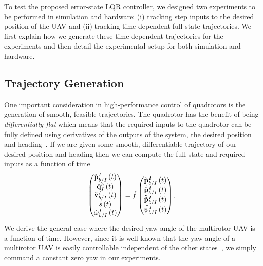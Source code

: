 
To test the proposed error-state LQR controller, we designed two experiments to be
performed in simulation and hardware: (i) tracking step inputs to the desired
position of the UAV and (ii) tracking time-dependent full-state trajectories. We
first explain how we generate these time-dependent trajectories for the
experiments and then detail the experimental setup for both simulation and
hardware.


\subsection{Trajectory Generation}
\label{subsec:trajectory_gen}

One important consideration in high-performance control of quadrotors is the
generation of smooth, feasible trajectories.  The quadrotor has the benefit of
being \emph{differentially flat} which means that the required inputs to the
quadrotor can be fully defined using derivatives of the outputs of the system,
the desired position and
heading~\cite{mellinger2011minimum}. If we are given some smooth, differentiable trajectory of our desired
position and heading then we can compute the full state and required inputs as
a function of time
\begin{equation}
	\begin{pmatrix} \check{\boldsymbol{\mathrm{p}}}_{b/I}^I \left( t \right) \\
	                \check{\boldsymbol{\mathrm{q}}}_I^b \left( t \right) \\
	                \check{\boldsymbol{\mathrm{v}}}_{b/I}^I \left( t \right) \\
	                \check{s} \left( t \right) \\
	                \check{\boldsymbol{\mathrm{\omega}}}_{b/I}^I \left( t \right)
	\end{pmatrix} = 
	\check{f} \begin{pmatrix} 
					\check{\boldsymbol{\mathrm{p}}}_{b/I}^I\left(t\right) \\ 
					\dot{\check{\boldsymbol{\mathrm{p}}}}_{b/I}^I\left(t\right) \\ 
					\ddot{\check{\boldsymbol{\mathrm{p}}}}_{b/I}^I\left(t\right) \\ 
					\check{\psi}_{b/I}^I\left(t\right)
	\end{pmatrix}.
\end{equation}
We derive the general case where the desired yaw angle of the multirotor UAV is
a function of time. However, since it is well known that the yaw angle of a multirotor UAV is
easily controllable independent of the other states~\cite{mellinger2011minimum}, we simply command a constant zero yaw in our experiments. 

